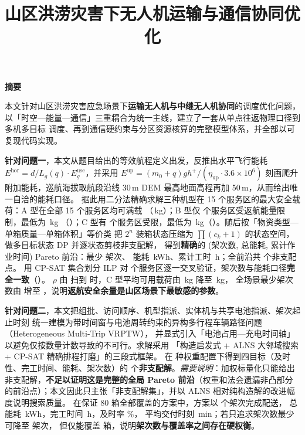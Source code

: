 \documentclass[12pt,a4paper,fontset=windows]{ctexart}
\title{\bfseries 山区洪涝灾害下无人机运输与通信协同优化}
\author{}
\date{}
\begin{document}
\maketitle
\thispagestyle{empty}

\begin{center}
{\Large\bfseries 摘\quad 要}
\end{center}

\noindent
本文针对山区洪涝灾害应急场景下\textbf{运输无人机与中继无人机协同}的调度优化问题，
以「时空—能量—通信」三重耦合为统一主线，建立了一套从单点往返物理口径到多机多目标
调度、再到通信硬约束与分区资源核算的完整模型体系，并全部以可复现代码实现。

\textbf{针对问题一}，本文从题目给出的等效航程定义出发，反推出水平飞行能耗
$E^{\mathrm{hor}}=d/L_g(q)\cdot E_g^{\mathrm{use}}$，并采用 $E^{\mathrm{up}}=(m_0+q)gh^+/(\eta_{\mathrm{up}}\cdot 3.6\times10^6)$
刻画爬升附加能耗，巡航海拔取航段沿线 30\,m DEM 最高地面高程再加 50\,m，从而给出唯一自洽的能耗口径。
据此用二分法精确求解三种机型在 15 个服务区的最大安全载荷：A 型在全部 15 个服务区均可满载
（\TypeAQmax\,kg）；B 型仅 \QoneLimitedB{} 个服务区受返航能量限制，最低为 \QoneMinPayB\,kg
（\QoneMinPayBArea）；C 型有 \QoneLimitedC{} 个服务区受限，最低为 \QoneMinPayC\,kg（\QoneMinPayCArea）。随后按「物资类型—单箱质量—单箱体积」等价类
把 $2^{n}$ 装箱状态压缩为 $\prod(c_k+1)$ 的状态空间，做多目标状态 DP 并逐状态剪枝非支配解，
得到\textbf{精确}的 (架次数, 总能耗, 累计作业时间) Pareto 前沿：最少 \QoneSorties 架次、
能耗 \QoneEnergyLeastSortie\,kWh、累计工时 \QoneTimeLeastSortie\,h；全前沿共 \QoneFrontN 个非支配点。
用 CP-SAT 集合划分 ILP 对 \QoneIPN 个服务区逐一交叉验证，架次数与能耗口径\textbf{完全一致}（\QoneIPAllOK）。
$\rho$ 由 \QoneRhoLo 扫到 \QoneRhoHi 时，C 型平均可用载荷由 \QoneRhoCPayLo\,kg 降至 \QoneRhoCPayHi\,kg，
全场景最少架次数由 \QoneRhoSortiesLo 增至 \QoneRhoSortiesHi，说明\textbf{返航安全余量是山区场景下最敏感的参数}。

\textbf{针对问题二}，本文把组批、访问顺序、机型指派、实体机与共享电池指派、架次起止时刻
统一建模为带时间窗与电池周转约束的异构多行程车辆路径问题（Heterogeneous Multi-Trip VRPTW），
并显式引入「电池占用—充电时间轴」以避免仅按数量计数导致的不可行。求解采用
「构造启发式 + ALNS 大邻域搜索 + CP-SAT 精确排程打磨」的三段式框架。
在 \QtwoConfigN 种权重配置下得到四目标（及时性、完工时间、能耗、架次数）的 \QtwoFrontN{} 个\textbf{非支配解}。\emph{需要说明}：加权标量化只能给出非支配解，\textbf{不足以证明这是完整的全局 Pareto 前沿}（权重和法会遗漏非凸部分的前沿点）；本文因此只主张「非支配解集」，并以 ALNS 相对纯构造解的改进幅度说明搜索质量。
在保证 80 箱全部覆盖的方案中，\QtwoBestName 方案以 \QtwoSorties 个架次完成配送，
总能耗 \QtwoEnergy\,kWh，完工时间 \QtwoMakespanH\,h，及时率 \QtwoOntimeRate\%，
平均交付时刻 \QtwoAvgDeliver\,min；若只追求架次数最少可降至 \QtwoLBSorties 架次，
但仅能覆盖 \QtwoLBBoxes 箱，说明\textbf{架次数与覆盖率之间存在硬权衡}。
\end{document}
